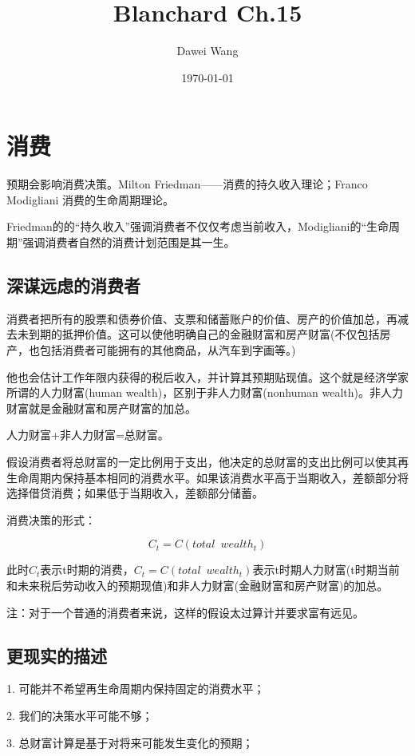 \documentclass{article}
\title{Blanchard Ch.15}
\author{Dawei Wang}
\date{\today}
\begin{document}
	\maketitle

\section{消费}

预期会影响消费决策。Milton Friedman——消费的持久收入理论；Franco Modigliani 消费的生命周期理论。

Friedman的的“持久收入”强调消费者不仅仅考虑当前收入，Modigliani的“生命周期”强调消费者自然的消费计划范围是其一生。

\subsection{深谋远虑的消费者}

消费者把所有的股票和债券价值、支票和储蓄账户的价值、房产的价值加总，再减去未到期的抵押价值。这可以使他明确自己的金融财富和房产财富(不仅包括房产，也包括消费者可能拥有的其他商品，从汽车到字画等。)

他也会估计工作年限内获得的税后收入，并计算其预期贴现值。这个就是经济学家所谓的人力财富(human wealth)，区别于非人力财富(nonhuman wealth)。非人力财富就是金融财富和房产财富的加总。

人力财富+非人力财富=总财富。

假设消费者将总财富的一定比例用于支出，他决定的总财富的支出比例可以使其再生命周期内保持基本相同的消费水平。如果该消费水平高于当期收入，差额部分将选择借贷消费；如果低于当期收入，差额部分储蓄。

消费决策的形式：

\[
C_t=C(total\enspace wealth_t)
\]

此时$ C_t $表示t时期的消费，$ C_t=C(total\enspace wealth_t) $表示t时期人力财富(t时期当前和未来税后劳动收入的预期现值)和非人力财富(金融财富和房产财富)的加总。

注：对于一个普通的消费者来说，这样的假设太过算计并要求富有远见。

\subsection{更现实的描述}

1. 可能并不希望再生命周期内保持固定的消费水平；

2. 我们的决策水平可能不够；

3. 总财富计算是基于对将来可能发生变化的预期；
\end{document}
